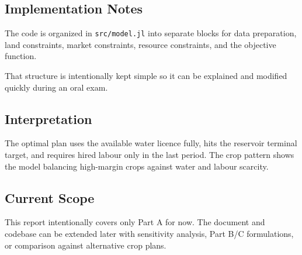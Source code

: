 \subsection{Implementation Notes}

The code is organized in \texttt{src/model.jl} into separate blocks for data preparation, land constraints, market constraints, resource constraints, and the objective function.

That structure is intentionally kept simple so it can be explained and modified quickly during an oral exam.

\subsection{Interpretation}

The optimal plan uses the available water licence fully, hits the reservoir terminal target, and requires hired labour only in the last period. The crop pattern shows the model balancing high-margin crops against water and labour scarcity.

\subsection{Current Scope}

This report intentionally covers only Part A for now. The document and codebase can be extended later with sensitivity analysis, Part B/C formulations, or comparison against alternative crop plans.